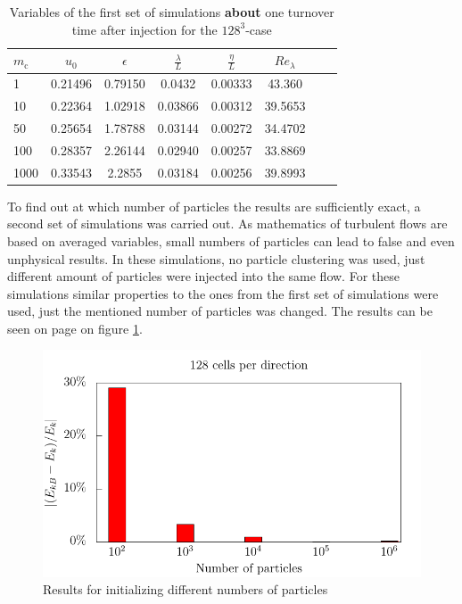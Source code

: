 \documentclass[11pt,a4paper,openany,oneside,parskip=half*]{article}
\begin{document}
\begin{table}[h]
\begin{center}
\begin{tabular}{l | c c c c c c c }
$m_\mathrm{c}$ & $u_0$ & $\epsilon$ & $\frac{\lambda}{L}$ & $\frac{\eta}{L} $ & $Re_\lambda$ \\
\hline
\hline
1 & 0.21496 & 0.79150 & 0.0432 & 0.00333 & 43.360  \\
10 & 0.22364 & 1.02918 & 0.03866 & 0.00312 & 39.5653 \\
50 & 0.25654 & 1.78788 & 0.03144 & 0.00272 & 34.4702   \\
100 & 0.28357 & 2.26144 & 0.02940 & 0.00257 & 33.8869 \\
1000 & 0.33543 & 2.2855 & 0.03184 & 0.00256 & 39.8993   \\
\hline
\end{tabular}
\caption{Variables of the first set of simulations \textbf{about} one turnover time after injection for the $128^3$-case}
\label{table_properties}
\end{center}
\end{table}
\newline
To find out at which number of particles the results are sufficiently exact, a second set of simulations was carried out. As mathematics of turbulent flows are based on averaged variables, small numbers of particles can lead to false and even unphysical results. In these simulations, no particle clustering was used, just different amount of particles were injected into the same flow. For these simulations similar properties to the ones from the first set of simulations were used, just the mentioned number of particles was changed. The results can be seen on page \pageref{kineticEnergy_numberOfParticles} on figure \ref{kineticEnergy_numberOfParticles}. 
\begin{figure}[h]
	\centering
  \includegraphics[width=\textwidth]{./../Simulationsergebnisse/variationPartikelAnzahl/128/kineticEnergy_numberOfParticles.pdf}
	\caption{Results for initializing different numbers of particles}
	\label{kineticEnergy_numberOfParticles}
\end{figure}
\end{document}
